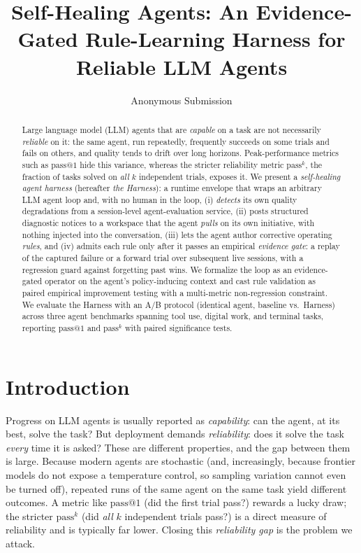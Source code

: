 \documentclass[letterpaper]{article} %
\title{Self-Healing Agents: An Evidence-Gated Rule-Learning Harness for Reliable LLM Agents}
\author{Anonymous Submission}
\makeatletter
\newcommand{\passk}{\mathrm{pass}^{k}}
\newcommand{\passone}{\mathrm{pass@}1}
\makeatother
\begin{document}
\maketitle

\begin{abstract}
Large language model (LLM) agents that are \emph{capable} on a task are not necessarily
\emph{reliable} on it: the same agent, run repeatedly, frequently succeeds on some trials and
fails on others, and quality tends to drift over long horizons. Peak-performance metrics such
as $\passone$ hide this variance, whereas the stricter reliability metric $\passk$, the
fraction of tasks solved on \emph{all} $k$ independent trials, exposes it. We present a
\emph{self-healing agent harness} (hereafter \emph{the Harness}): a runtime envelope that wraps
an arbitrary LLM agent loop and, with no human in the loop, (i) \emph{detects} its own quality
degradations from a session-level agent-evaluation service, (ii) posts structured diagnostic
notices to a workspace that the agent \emph{pulls} on its own initiative, with nothing injected
into the conversation, (iii) lets the agent author corrective operating \emph{rules}, and (iv)
admits each rule only after it passes an empirical \emph{evidence gate}: a replay of the
captured failure or a forward trial over subsequent live sessions, with a regression guard
against forgetting past wins. We formalize the loop as an evidence-gated operator on the
agent's policy-inducing context and cast rule validation as paired empirical improvement
testing with a multi-metric non-regression constraint. We evaluate the Harness with an A/B
protocol (identical agent, baseline vs.\ Harness) across three agent benchmarks spanning tool
use, digital work, and terminal tasks, reporting $\passone$ and $\passk$ with paired
significance tests.
\end{abstract}

\section{Introduction}
\label{sec:intro}

Progress on LLM agents is usually reported as \emph{capability}: can the agent, at its best,
solve the task? But deployment demands \emph{reliability}: does it solve the task \emph{every}
time it is asked? These are different properties, and the gap between them is large. Because
modern agents are stochastic (and, increasingly, because frontier models do not expose a
temperature control, so sampling variation cannot even be turned off), repeated runs of the
same agent on the same task yield different outcomes. A metric like $\passone$ (did the first
trial pass?) rewards a lucky draw; the stricter $\passk$ (did \emph{all} $k$ independent trials
pass?) is a direct measure of reliability and is typically far lower. Closing this
\emph{reliability gap} is the problem we attack.
\end{document}
